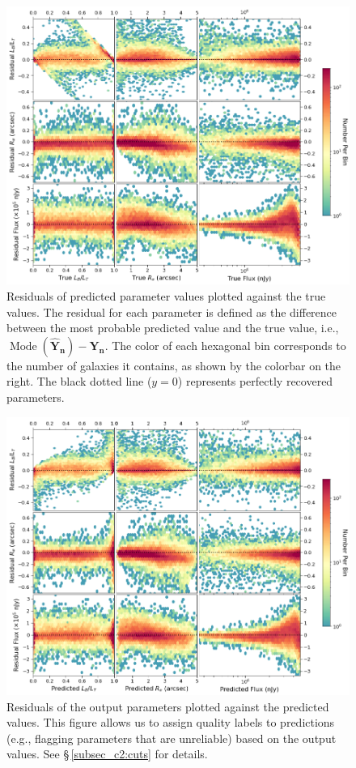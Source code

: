 \begin{figure}[htb]
    \centering
    \includegraphics[width
    =\textwidth]{2d_hist_residuals.png}
    \caption{Residuals of \gampen{} predicted parameter values plotted against the true values. The residual for each parameter is defined as the difference between the most probable predicted value and the true value, i.e., $\operatorname{Mode}(\boldsymbol{\hat{Y}_n}) - \boldsymbol{Y_n}$. The color of each hexagonal bin corresponds to the number of galaxies it contains, as shown by the colorbar on the right. The black dotted line ($y=0$) represents %
    perfectly recovered parameters.}
    \label{fig_c2:2d_residual_hists}
\end{figure}

\begin{figure}[htb]
    \centering
    \includegraphics[width
    =\textwidth]{2d_hist_residuals_preds.png}
    \caption{Residuals of the output parameters plotted against the predicted values. This figure allows us to assign quality labels to \gampen{} predictions (e.g., flagging parameters that are unreliable) based on the output values. See \S\,\ref{subsec_c2:cuts} for details.}
    \label{fig_c2:2d_residual_hists_pred}
\end{figure}

